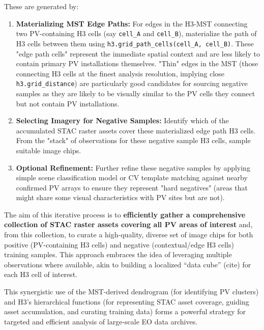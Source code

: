 \begin{enumerate}
\begin{enumerate}
\begin{itemize}
                These are generated by:
                    \begin{enumerate}
                        \item \textbf{Materializing MST Edge Paths:} For edges in the H3-MST connecting two PV-containing H3 cells (say \texttt{cell\_A} and \texttt{cell\_B}), materialize the path of H3 cells between them using \texttt{h3.grid\_path\_cells(cell\_A, cell\_B)}. These "edge path cells" represent the immediate spatial context and are less likely to contain primary PV installations themselves. 
                        "Thin" edges in the MST (those connecting H3 cells at the finest analysis resolution, implying close \texttt{h3.grid\_distance}) are particularly good candidates for sourcing negative samples as they are likely to be visually similar to the PV cells they connect but not contain PV installations.
                        \item \textbf{Selecting Imagery for Negative Samples:} Identify which of the accumulated STAC raster assets cover these materialized edge path H3 cells. From the "stack" of observations for these negative sample H3 cells, sample suitable image chips. 
                        \item \textbf{Optional Refinement:} Further refine these negative samples by applying simple scene classification model or CV template matching against nearby confirmed PV arrays to ensure they represent "hard negatives" 
                        (areas that might share some visual characteristics with PV sites but are not). 
                    \end{enumerate}
            \end{itemize}
        \end{enumerate}
        The aim of this iterative process is to \textbf{efficiently gather a comprehensive collection of STAC raster assets covering all PV areas of interest} and, from this collection, to curate a high-quality, diverse set of image chips for both 
        positive (PV-containing H3 cells) and negative (contextual/edge H3 cells) training samples. This approach embraces the idea of leveraging multiple observations where available, akin to building a localized ``data cube'' (cite) for each H3 cell of interest. 
\end{enumerate}
This synergistic use of the MST-derived dendrogram (for identifying PV clusters) and H3's hierarchical functions (for representing STAC asset coverage, guiding asset accumulation, and curating training data) 
forms a powerful strategy for targeted and efficient analysis of large-scale EO data archives.
\bigskip

